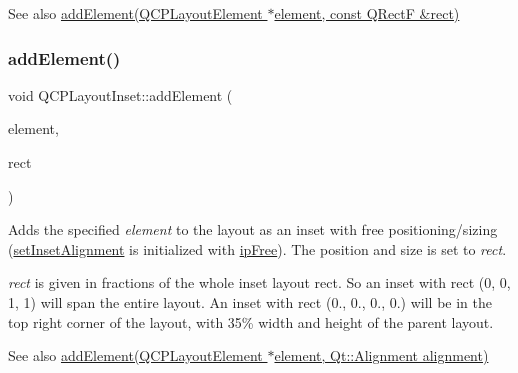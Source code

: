 \begin{DoxySeeAlso}{See also}
\hyperlink{class_q_c_p_layout_inset_a8ff61fbee4a1f0ff45c398009d9f1e56}{add\+Element(\+Q\+C\+P\+Layout\+Element $\ast$element, const Q\+Rect\+F \&rect)} 
\end{DoxySeeAlso}
\hypertarget{class_q_c_p_layout_inset_a8ff61fbee4a1f0ff45c398009d9f1e56}{}\label{class_q_c_p_layout_inset_a8ff61fbee4a1f0ff45c398009d9f1e56} 
\subsubsection{\texorpdfstring{add\+Element()}{addElement()}\hspace{0.1cm}{\footnotesize\ttfamily [2/2]}}
{\footnotesize\ttfamily void Q\+C\+P\+Layout\+Inset\+::add\+Element (\begin{DoxyParamCaption}\item[{\hyperlink{class_q_c_p_layout_element}{Q\+C\+P\+Layout\+Element} $\ast$}]{element,  }\item[{const Q\+RectF \&}]{rect }\end{DoxyParamCaption})}

Adds the specified {\itshape element} to the layout as an inset with free positioning/sizing (\hyperlink{class_q_c_p_layout_inset_a62882a4f9ad58bb0f53da12fde022abe}{set\+Inset\+Alignment} is initialized with \hyperlink{class_q_c_p_layout_inset_a8b9e17d9a2768293d2a7d72f5e298192aa4802986ea2cea457f932b115acba59e}{ip\+Free}). The position and size is set to {\itshape rect}.

{\itshape rect} is given in fractions of the whole inset layout rect. So an inset with rect (0, 0, 1, 1) will span the entire layout. An inset with rect (0., 0., 0., 0.) will be in the top right corner of the layout, with 35\% width and height of the parent layout.

\begin{DoxySeeAlso}{See also}
\hyperlink{class_q_c_p_layout_inset_ad61529eb576af7f04dff94abb10c745a}{add\+Element(\+Q\+C\+P\+Layout\+Element $\ast$element, Qt\+::\+Alignment alignment)} 
\end{DoxySeeAlso}
\hypertarget{class_q_c_p_layout_inset_a832e049f0bb32e7db0490a9c904098df}{}\label{class_q_c_p_layout_inset_a832e049f0bb32e7db0490a9c904098df} 

